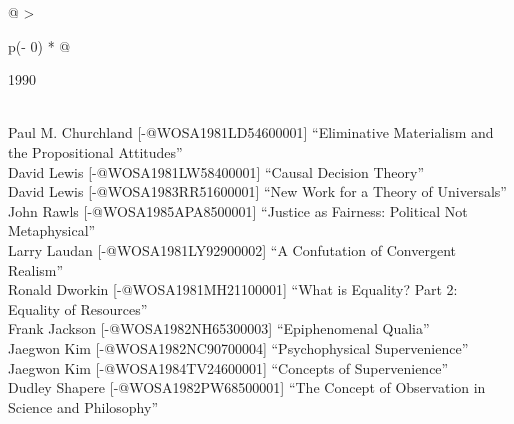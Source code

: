 \documentclass[
  10pt,
  letterpaper,
  DIV=11,
  numbers=noendperiod,
  twoside]{scrartcl}
\begin{document}
\begin{longtable}[]{@{}
  >{\raggedright\arraybackslash}p{(\columnwidth - 0\tabcolsep) * }@{}}

\caption{\label{tbl-top-ten-1981}Most cited articles published less than
ten years ago as of 1990.}

\tabularnewline

\toprule\noalign{}
\begin{minipage}[b]{\linewidth}\raggedright
1990
\end{minipage} \\
\midrule\noalign{}
\endhead
\bottomrule\noalign{}
\endlastfoot
Paul M. Churchland {[}-@WOSA1981LD54600001{]} ``Eliminative Materialism
and the Propositional Attitudes'' \\
David Lewis {[}-@WOSA1981LW58400001{]} ``Causal Decision Theory'' \\
David Lewis {[}-@WOSA1983RR51600001{]} ``New Work for a Theory of
Universals'' \\
John Rawls {[}-@WOSA1985APA8500001{]} ``Justice as Fairness: Political
Not Metaphysical'' \\
Larry Laudan {[}-@WOSA1981LY92900002{]} ``A Confutation of Convergent
Realism'' \\
Ronald Dworkin {[}-@WOSA1981MH21100001{]} ``What is Equality? Part 2:
Equality of Resources'' \\
Frank Jackson {[}-@WOSA1982NH65300003{]} ``Epiphenomenal Qualia'' \\
Jaegwon Kim {[}-@WOSA1982NC90700004{]} ``Psychophysical
Supervenience'' \\
Jaegwon Kim {[}-@WOSA1984TV24600001{]} ``Concepts of Supervenience'' \\
Dudley Shapere {[}-@WOSA1982PW68500001{]} ``The Concept of Observation
in Science and Philosophy'' \\

\end{longtable}
\end{document}
